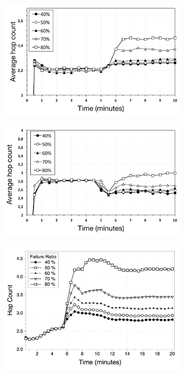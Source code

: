 \begin{figure}
\centering
\begin{subfigure}{.5\textwidth}
  \centering
  \includegraphics[keepaspectratio=true, width=1\linewidth]{images/average_hop_count_failures_1impl}
  \caption{}
  \label{fig:average_hop_count_failures_1impl}
\end{subfigure}%
\begin{subfigure}{.5\textwidth}
  \centering
  \includegraphics[keepaspectratio=true, width=1\linewidth]{images/average_hop_count_failures_2impl}
  \caption{}
  \label{fig:average_hop_count_failures_2impl}
\end{subfigure}
\begin{subfigure}{.5\textwidth}
  \centering
  \includegraphics[keepaspectratio=true, width=1\linewidth]{images/paper_average_hop_count_failures}

\end{subfigure}
\end{figure}
